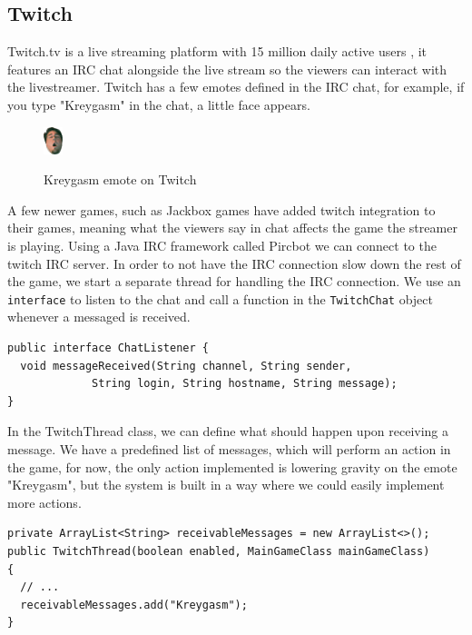 \documentclass[12p]{article}
\begin{document}

\newpage
\subsection{Twitch} \label{Twitch}

Twitch.tv is a live streaming platform with 15 million daily active users \cite{twitchAbout}, it features an IRC chat alongside the live stream so the viewers can interact with the livestreamer. Twitch has a few emotes defined in the IRC chat, for example, if you type "Kreygasm" in the chat, a little face appears.

\begin{figure}[ht]
 \center
 \includegraphics[width=0.05\textwidth]{Documentation/Kreygasm.png}
 \label{Kreygasm_emote}
 \caption{Kreygasm emote on Twitch \cite{TwitchEmotes}}
\end{figure}

A few newer games, such as Jackbox games \cite{JackboxGames} have added twitch integration to their games, meaning what the viewers say in chat affects the game the streamer is playing. Using a Java IRC framework called Pircbot \cite{pircbot} we can connect to the twitch IRC server. In order to not have the IRC connection slow down the rest of the game, we start a separate thread for handling the IRC connection. We use an \texttt{interface} to listen to the chat and call a function in the \texttt{TwitchChat} object whenever a messaged is received.

\begin{verbatim}
public interface ChatListener {
  void messageReceived(String channel, String sender,
             String login, String hostname, String message);
}
\end{verbatim}

In the TwitchThread class, we can define what should happen upon receiving a message. We have a predefined list of messages, which will perform an action in the game, for now, the only action implemented is lowering gravity on the emote "Kreygasm", but the system is built in a way where we could easily implement more actions.

\begin{verbatim}
private ArrayList<String> receivableMessages = new ArrayList<>();
public TwitchThread(boolean enabled, MainGameClass mainGameClass)
{
  // ...
  receivableMessages.add("Kreygasm");
}
\end{verbatim}
\end{document}
